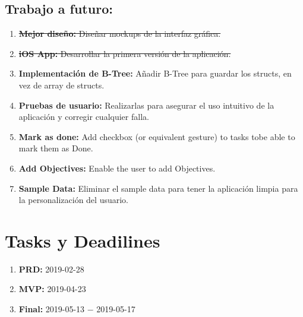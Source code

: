 \documentclass[]{article}
\begin{document}
\subsection{Trabajo a futuro:}
\begin{enumerate}
	\item \sout{\textbf{Mejor diseño:} Diseñar mockups de la interfaz gráfica.}
	\item \sout{\textbf{iOS App:} Desarrollar la primera versión de la aplicación.}
	\item \textbf{Implementación de B-Tree:} Añadir B-Tree para guardar los structs, en vez de array de structs.
	\item \textbf{Pruebas de usuario:} Realizarlas para asegurar el uso intuitivo de la aplicación y corregir cualquier falla.
	\item \textbf{Mark as done:} Add checkbox (or equivalent gesture) to tasks tobe able to mark them as Done.
	\item \textbf{Add Objectives:} Enable the user to add Objectives.
	\item \textbf{Sample Data:} Eliminar el sample data para tener la aplicación limpia para la personalización del usuario.

\end{enumerate}
\section{Tasks y Deadilines}
\begin{enumerate}
	\item \textbf{PRD:} 2019-02-28
	\item \textbf{MVP:} 2019-04-23
	\item \textbf{Final:} 2019-05-13 $-$ 2019-05-17
\end{enumerate}
\end{document}
